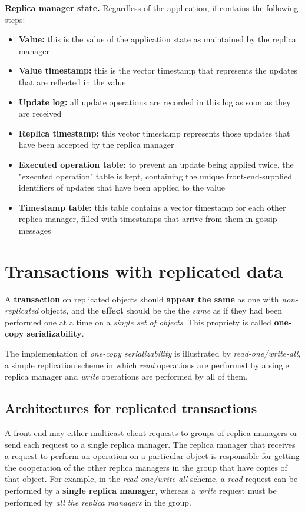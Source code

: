 \textbf{Replica manager state.} Regardless of the application, if contains the following steps:
\begin{itemize}
    \item \textbf{Value:} this is the value of the application state as maintained by the replica manager
    \item \textbf{Value timestamp:} this is the vector timestamp that represents the updates that are reflected in the value
    \item \textbf{Update log:} all update operations are recorded in this log as soon as they are received 
    \item \textbf{Replica timestamp:} this vector timestamp represents those updates that have been accepted by the replica manager
    \item \textbf{Executed operation table:} to prevent an update being applied twice, the "executed operation" table is kept, containing the unique front-end-supplied identifiers of updates that have been applied to the value
    \item \textbf{Timestamp table:} this table contains a vector timestamp for each other replica manager, filled with timestamps that arrive from them in gossip messages
\end{itemize}

\section{Transactions with replicated data}
A \textbf{transaction} on replicated objects should \textbf{appear the same} as one with \textit{non-replicated} objects, and the \textbf{effect} should be the the \textit{same} as if they had been performed one at a time on a \textit{single set of objects}. This propriety is called \textbf{one-copy serializability}.

The implementation of \textit{one-copy serializability} is illustrated by \textit{read-one/write-all}, a simple replication scheme in which \textit{read} operations are performed by a single replica manager and \textit{write} operations are performed by all of them.

\subsection{Architectures for replicated transactions}
A front end may either multicast client requests to groups of replica managers or send each request to a single replica manager. The replica manager that receives a request to perform an operation on a particular object is responsible for getting the cooperation of the other replica managers in the group that have copies of that object. For example, in the \textit{read-one/write-all} scheme, a \textit{read} request can be performed by a \textbf{single replica manager}, whereas a \textit{write} request must be performed by \textit{all the replica managers} in the group.

